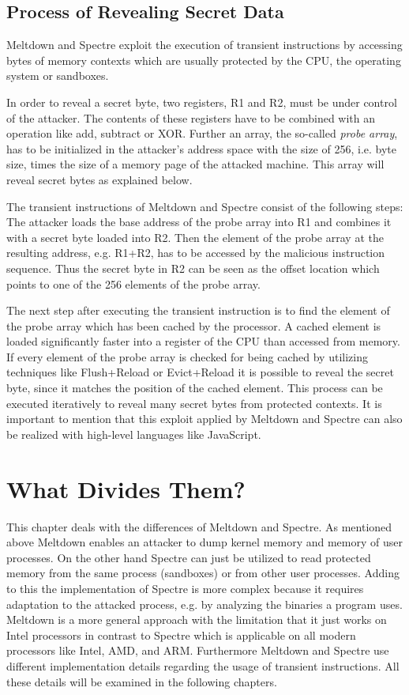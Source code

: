 \documentclass[a4paper,oneside,openright] {scrreprt}
\begin{document}
\subsection{Process of Revealing Secret Data}
\label{ch:intro:motivation:A}

Meltdown and Spectre exploit the execution of transient instructions by accessing bytes of memory contexts 
 which are usually protected by the CPU, the operating system or sandboxes. 

In order to reveal a secret byte, two registers, R1 and R2, must be under control of the attacker. The contents of these registers have to be 
combined with an operation like add, subtract or XOR. Further an array, the so-called \textit{probe array}, has to be 
initialized in the attacker's address space with the size of 256, i.e. byte size, times the size of a memory page of the attacked machine.
This array will reveal secret bytes as explained below.

The transient instructions of Meltdown and Spectre consist of the following steps:
The attacker loads the base address of the probe array into R1 and combines it with a secret byte loaded into R2. 
Then the element of the probe array at the resulting address, e.g. R1+R2, has to be accessed by the malicious instruction sequence.
Thus the secret byte in R2 can be seen as the offset location which points to one of the 256 elements of the probe array.

The next step after executing the transient instruction is to find the element of the probe array which has been cached by the processor.
A cached element is loaded significantly faster into a register of the CPU than accessed from memory.
If every element of the probe array is checked for being cached by utilizing techniques like Flush+Reload or Evict+Reload it is possible
to reveal the secret byte, since it matches the position of the cached element.
This process can be executed iteratively to reveal many secret bytes from protected contexts. It is important to mention that this exploit
applied by Meltdown and Spectre can also be realized with high-level languages like JavaScript.

\section{What Divides Them?}
\label{ch:whatDividesThem}

This chapter deals with the differences of Meltdown and Spectre. As mentioned above Meltdown enables an attacker 
to dump kernel memory and memory of user processes. On the other hand Spectre can just be utilized to read protected memory from 
the same process (sandboxes) or from other user processes.
Adding to this the implementation of Spectre is more complex because it requires adaptation to the attacked process,
 e.g. by analyzing the binaries a program uses. Meltdown is a more general approach with the limitation that it just works on Intel
 processors in contrast to Spectre which is applicable on all modern processors like Intel, AMD, and ARM. Furthermore Meltdown and 
 Spectre use different implementation details regarding the usage of transient instructions.
 All these details will be examined in the following chapters.
\end{document}
